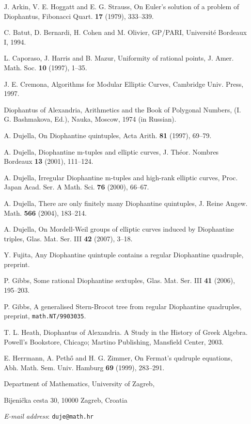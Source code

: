 \documentclass [11pt] {article}
\begin{document}
\begin{thebibliography}{99}

\small{
J. Arkin, V. E. Hoggatt and E. G. Strauss,
On Euler's solution of a problem of Diophantus, Fibonacci Quart.
{\bf 17} (1979), 333--339.

C. Batut, D. Bernardi, H. Cohen and M. Olivier, GP/PARI, Universit\'e
Bordeaux I, 1994.

L. Caporaso, J. Harris and B. Mazur, Uniformity of
rational points, J. Amer. Math. Soc. {\bf 10} (1997), 1--35.

J. E. Cremona, Algorithms for Modular Elliptic Curves,
Cambridge Univ. Press, 1997.

Diophantus of Alexandria, Arithmetics and the Book of
Polygonal Numbers, (I. G. Bashmakova, Ed.),
Nauka, Moscow, 1974 (in Russian).

A. Dujella, On Diophantine quintuples, Acta Arith. {\bf 81} (1997),
69--79.

A. Dujella, Diophantine m-tuples and elliptic curves,
J. Th\'eor. Nombres Bordeaux {\bf 13} (2001), 111--124.

A. Dujella, Irregular Diophantine m-tuples and high-rank elliptic curves,
Proc. Japan Acad. Ser. A Math. Sci. {\bf 76} (2000), 66--67.

A. Dujella, There are only finitely many Diophantine quintuples, J. Reine Angew. Math.
{\bf 566} (2004), 183--214.

A. Dujella, On Mordell-Weil groups of elliptic curves induced by Diophantine
triples, Glas. Mat. Ser. III {\bf 42} (2007), 3--18.

Y. Fujita, Any Diophantine quintuple contains a regular Diophantine quadruple, preprint.

P. Gibbs, Some rational Diophantine sextuples,
Glas. Mat. Ser. III {\bf 41} (2006), 195--203.

P. Gibbs, A generalised Stern-Brocot tree from regular Diophantine
quadruples, preprint, {\tt math.NT/9903035}.

T. L. Heath, Diophantus of Alexandria. A Study in the History of Greek Algebra.
Powell's Bookstore, Chicago; Martino Publishing, Mansfield Center, 2003.

E. Herrmann, A. Peth\H{o} and H. G. Zimmer,
On Fermat's qudruple equations, Abh. Math. Sem. Univ. Hamburg {\bf 69} (1999), 283--291.

}
\end{thebibliography}

\medskip

{\footnotesize
Department of Mathematics, University of Zagreb,

 Bijeni\v{c}ka cesta 30, 10000 Zagreb, Croatia

{\em E-mail address}: {\tt duje@math.hr} }
\end{document}
